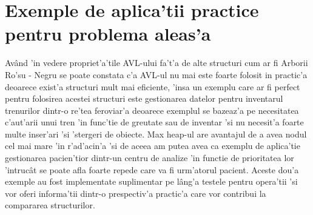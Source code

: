 \section{Exemple de aplica'tii practice pentru problema aleas'a}
Av\^and 'in vedere propriet'a'tile AVL-ului fa't'a de alte structuri cum ar fi Arborii Ro'su - Negru se poate constata c'a AVL-ul nu mai este foarte folosit in practic'a deoarece exist'a structuri mult mai eficiente, 'insa un exemplu care ar fi perfect pentru folosirea acestei structuri este gestionarea datelor pentru inventarul trenurilor dintr-o re'tea feroviar'a deoarece exemplul se bazeaz'a pe necesitatea c'aut'arii unui tren 'in func'tie de greutate sau de inventar 'si nu necesit'a foarte multe inser'ari 'si 'stergeri de obiecte. Max heap-ul are avantajul de a avea nodul cel mai mare 'in r'ad'acin'a 'si de aceea am putea avea ca exemplu de aplica'tie gestionarea pacien'tior dintr-un centru de analize 'in functie de prioritatea lor 'intruc\^at se poate afla foarte repede care va fi urm'atorul pacient. Aceste dou'a exemple au fost implementate suplimentar pe l\^ang'a testele pentru opera'tii 'si vor oferi informa'tii dintr-o prespectiv'a practic'a care vor contribui la compararea structurilor.